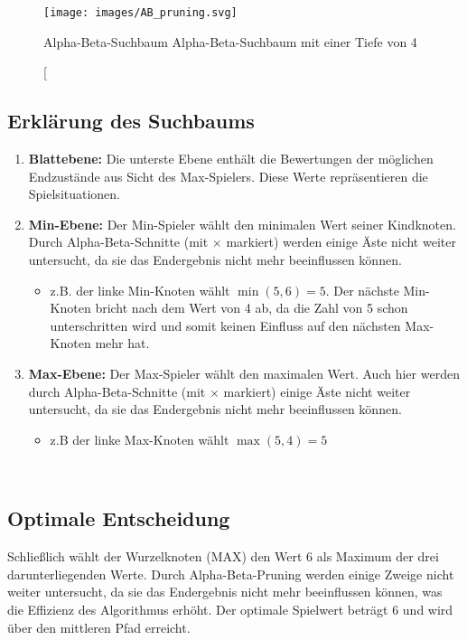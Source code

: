 \begin{figure}[H]
	\centering
	\texttt{[image: images/AB\_pruning.svg]}
	\caption[Alpha-Beta-Suchbaum \autocite{Wikipedia:AlphaBeta}{Alpha-Beta-Suchbaum mit einer Tiefe von 4}
	\label{fig:abpruning}
\end{figure}

\subsection*{Erklärung des Suchbaums}

\begin{enumerate} \item \textbf{Blattebene:} Die unterste Ebene enthält die Bewertungen der möglichen Endzustände aus Sicht des Max-Spielers. Diese Werte repräsentieren die Spielsituationen.
	\item \textbf{Min-Ebene:} Der Min-Spieler wählt den minimalen Wert seiner Kindknoten. Durch Alpha-Beta-Schnitte (mit $\times$ markiert) werden einige Äste nicht weiter untersucht, da sie das Endergebnis nicht mehr beeinflussen können. \begin{itemize} \item z.B. der linke Min-Knoten wählt $\min(5, 6) = 5$. Der nächste Min-Knoten bricht nach dem Wert von 4 ab, da die Zahl von 5 schon unterschritten wird und somit keinen Einfluss auf den nächsten Max-Knoten mehr hat.
    \end{itemize}
	\item \textbf{Max-Ebene:} Der Max-Spieler wählt den maximalen Wert. Auch hier werden durch Alpha-Beta-Schnitte (mit $\times$ markiert) einige Äste nicht weiter untersucht, da sie das Endergebnis nicht mehr beeinflussen können. 
	\begin{itemize} \item z.B der linke Max-Knoten wählt $\max(5, 4) = 5$  
	\end{itemize}
	 \end{enumerate}

\subsection*{Optimale Entscheidung}
Schließlich wählt der Wurzelknoten (MAX) den Wert 6 als Maximum der drei darunterliegenden Werte. Durch Alpha-Beta-Pruning werden einige Zweige nicht weiter untersucht, da sie das Endergebnis nicht mehr beeinflussen können, was die Effizienz des Algorithmus erhöht. Der optimale Spielwert beträgt 6 und wird über den mittleren Pfad erreicht.

